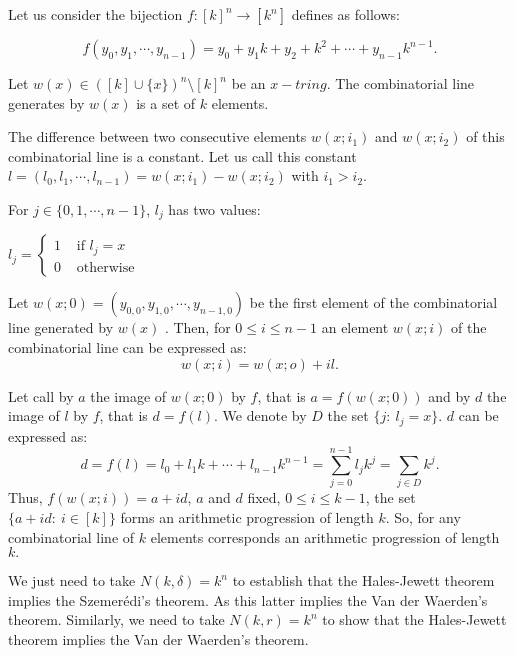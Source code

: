 Let us consider the bijection $f:[k]^n \longrightarrow [k^n]$ defines as follows:

$$f(y_0,y_1,\cdots, y_{n-1})=y_0+y_1k+y_2+k^2+\cdots+y_{n-1}k^{n-1}.$$

Let $w(x) \in ([k] \cup \{x\})^n\setminus [k]^n$ be an $x-tring.$ The combinatorial line generates by $w(x)$ is a set of $k$ elements.

The difference between two consecutive elements $w(x;i_1)$ and $w(x;i_2)$ of this combinatorial line is a constant. Let us call this constant $l=(l_0, l_1, \cdots, l_{n-1})= w(x;i_1)-w(x;i_2)$ with $i_1 > i_2.$

For $j\in \{0,1,\cdots, n-1\}$, $l_j$ has two values:

$l_j= \left\lbrace \begin{array}{ll}1 & \text{ if } l_j=x \\ 0 & \text{ otherwise}    \end{array} \right.$

Let $w(x;0)=(y_{0,0},y_{1,0},\cdots, y_{n-1,0})$ be the first element of the combinatorial line generated by $w(x)$ . Then, for $0\leq i \leq n-1$ an element $w(x;i)$ of the combinatorial line can be expressed as: $$w(x;i)=w(x;o)+il.$$

Let call by $a$ the image of $w(x;0)$ by $f$, that is $a=f(w(x;0))$ and by $d$ the image of $l$ by $f$, that is $d=f(l).$ We denote by $D$ the set $\{j: \ l_j=x\}.$ $d$ can be expressed as:
$$d=f(l)=l_0+l_1k+\cdots+l_{n-1}k^{n-1}=\sum_{j=0}^{n-1}l_jk^j= \sum_{j\in D} k^j.$$
Thus, $f(w(x;i))=a+id$, $a$ and $d$ fixed, $0\leq i \leq k-1$, the set $\{a+id: \ i\in [k]\}$ forms an arithmetic progression of length $k.$ So, for any combinatorial line of $k$ elements corresponds an arithmetic progression of length $k.$

We just need to take $N(k,\delta)=k^n$ to establish that the Hales-Jewett theorem implies the Szemerédi's theorem. As this latter implies the Van der Waerden's theorem. Similarly, we need to take $N(k,r)=k^n$ to show that the Hales-Jewett theorem implies the Van der Waerden's theorem.


























